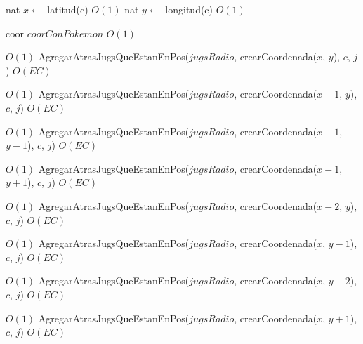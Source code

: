 \begin{Algoritmos}
\begin{algorithmic}[1]
\State nat $x \gets$ latitud(c)    \Comment $O(1)$
\State nat $y \gets$ longitud(c)   \Comment $O(1)$

\State coor $coorConPokemon$    \Comment $O(1)$

     \Comment $O(1)$
    \State AgregarAtrasJugsQueEstanEnPos($jugsRadio$, crearCoordenada($x$, $y$), $c$, $j$)    \Comment $O(EC)$
\EndIf

         \Comment $O(1)$
        \State AgregarAtrasJugsQueEstanEnPos($jugsRadio$, crearCoordenada($x-1$, $y$), $c$, $j$)    \Comment $O(EC)$
    \EndIf


             \Comment $O(1)$
            \State AgregarAtrasJugsQueEstanEnPos($jugsRadio$, crearCoordenada($x-1$, $y-1$), $c$, $j$)    \Comment $O(EC)$
        \EndIf

    \EndIf

             \Comment $O(1)$
            \State AgregarAtrasJugsQueEstanEnPos($jugsRadio$, crearCoordenada($x-1$, $y+1$), $c$, $j$)    \Comment $O(EC)$
        \EndIf
    \EndIf

             \Comment $O(1)$
            \State AgregarAtrasJugsQueEstanEnPos($jugsRadio$, crearCoordenada($x-2$, $y$), $c$, $j$)    \Comment $O(EC)$
        \EndIf
    \EndIf

\EndIf


         \Comment $O(1)$
        \State AgregarAtrasJugsQueEstanEnPos($jugsRadio$, crearCoordenada($x$, $y-1$), $c$, $j$)    \Comment $O(EC)$
    \EndIf


             \Comment $O(1)$
            \State AgregarAtrasJugsQueEstanEnPos($jugsRadio$, crearCoordenada($x$, $y-2$), $c$, $j$)    \Comment $O(EC)$
        \EndIf

    \EndIf

\EndIf


         \Comment $O(1)$
        \State AgregarAtrasJugsQueEstanEnPos($jugsRadio$, crearCoordenada($x$, $y+1$), $c$, $j$)    \Comment $O(EC)$
    \EndIf



\end{algorithmic}
\end{Algoritmos}
